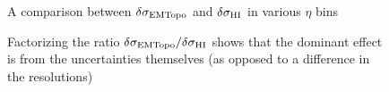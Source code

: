 \begin{figure}
	\centering
	\caption{A comparison between $\delta\sigma_{\text{EMTopo}}$ and $\delta\sigma_{\mathrm{HI}}$ in various $\eta$ bins}
	\label{fig:meth2_jer_uncert}%
\end{figure}

\begin{figure}
	\centering
	\caption{Factorizing the ratio $\delta\sigma_{\text{EMTopo}} / \delta\sigma_{\mathrm{HI}}$ shows that the dominant effect is from the uncertainties themselves (as opposed to a difference in the resolutions)}
	\label{fig:meth2_ratios}%
\end{figure}

